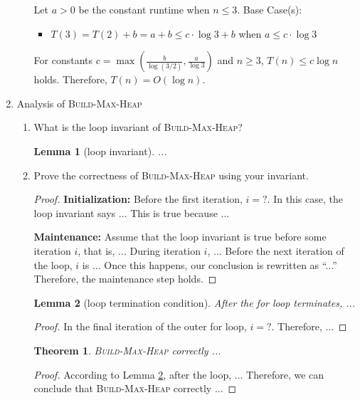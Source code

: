\documentclass[11pt]{article}
\newtheorem{theorem}{Theorem}
\newtheorem{lemma}{Lemma}
\begin{document}
\begin{enumerate}
\begin{enumerate}
            Let $a > 0$ be the constant runtime when $n\leq 3$. Base Case(s):
            \begin{itemize}
                \item $T(3) = T(2) + b = a + b \leq c \cdot \log 3 + b$ when $a \leq c \cdot \log 3$
            \end{itemize}

            For constants $c = \max\left(\frac{b}{\log(3/2)}, \frac{a}{\log 3}\right)$ and $n \geq 3$, $T(n) \leq c \log n$ holds. Therefore, $T(n) = O(\log n)$.\\
            \end{enumerate}

    \item Analysis of \textsc{Build-Max-Heap}
    \begin{enumerate}
        \item What is the loop invariant of \textsc{Build-Max-Heap}?

        \begin{lemma}[loop invariant]
        ...
        \label{invar}
        \end{lemma}
        
        \item Prove the correctness of \textsc{Build-Max-Heap} using your invariant.

        \begin{proof}
        \textbf{Initialization:} Before the first iteration, $i=?$.  In this case, the loop invariant says ... This is true because ...
        
        \textbf{Maintenance:} Assume that the loop invariant is true before some iteration $i$, that is, ... During iteration $i$, ... Before the next iteration of the loop, $i$ is ...  Once this happens, our conclusion is rewritten as ``...''  Therefore, the maintenance step holds.
        \end{proof}
        
        \begin{lemma}[loop termination condition]
        After the for loop terminates, ...
        \label{term}
        \end{lemma}
        
        \begin{proof}
        In the final iteration of the outer for loop, $i = ?$. Therefore, ...
        \end{proof}
        
        \begin{theorem}
        \textsc{Build-Max-Heap} correctly ...
        \end{theorem}
        
        \begin{proof}
        According to Lemma \ref{term}, after the loop, ... Therefore, we can conclude that \textsc{Build-Max-Heap} correctly ...
        \end{proof}
    \end{enumerate}
    
\end{enumerate}
\end{document}
